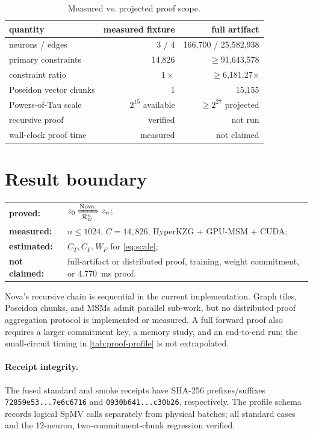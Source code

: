 \documentclass[9pt,twocolumn]{extarticle}
\newcommand{\code}[1]{\texttt{#1}}
\begin{document}
\begin{table}[t]
\centering
\caption{Measured vs. projected proof scope.}
\label{tab:scope}
\scriptsize
\begin{tabularx}{\columnwidth}{@{}l r r@{}}
\toprule
quantity & measured fixture & full artifact\\
\midrule
neurons / edges & 3 / 4 & 166,700 / 25,582,938\\
primary constraints & 14,826 & $\geq$91,643,578\\
constraint ratio & $1\times$ & $\geq$6,181.27$\times$\\
Poseidon vector chunks & 1 & 15,155\\
Powers-of-Tau scale & $2^{15}$ available & $\geq2^{27}$ projected\\
recursive proof & verified & not run\\
wall-clock proof time & measured & not claimed\\
\bottomrule
\end{tabularx}
\end{table}

\section{Result boundary}

\begin{tabularx}{\columnwidth}{@{}lX@{}}
\textbf{proved:} & $z_0\xRightarrow[\mathcal R_G^n]{\mathrm{Nova}}z_n$;\\
\textbf{measured:} & $n\leq1024$, $C=14{,}826$, HyperKZG + GPU-MSM + CUDA;\\
\textbf{estimated:} & $C_T,C_F,W_F$ for \cref{eq:scale};\\
\textbf{not claimed:} & full-artifact or distributed proof, training, weight commitment, or \SI{4.770}{ms} proof.\\
\end{tabularx}
Nova's recursive chain is sequential in the current implementation.  Graph
tiles, Poseidon chunks, and MSMs admit parallel sub-work, but no distributed
proof aggregation protocol is implemented or measured.  A full forward proof
also requires a larger commitment key, a memory study, and an end-to-end run;
the small-circuit timing in \cref{tab:proof-profile} is not extrapolated.

\paragraph{Receipt integrity.}
The fused standard and smoke receipts have SHA-256 prefixes/suffixes
\code{72859e53...7e6c6716} and \code{0930b641...c30b26}, respectively.
The profile schema records logical SpMV calls separately from physical batches;
all standard cases and the 12-neuron, two-commitment-chunk regression verified.



\end{document}
